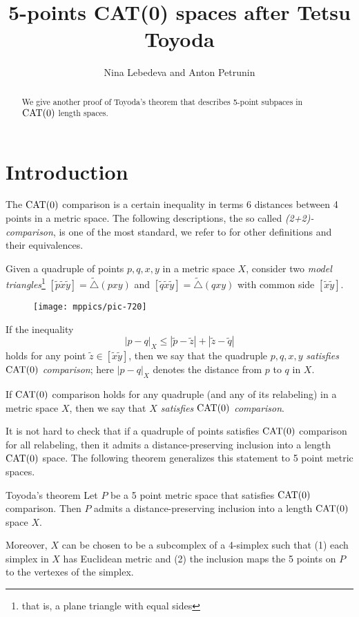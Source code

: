 \documentclass{article}
\begin{document}
\title{5-points CAT(0) spaces after  Tetsu Toyoda}
\author{Nina Lebedeva and Anton Petrunin}
\date{}
\maketitle
\begin{abstract}
We give another proof of Toyoda's theorem that describes 5-point subpaces in $\mathrm{CAT}(0)$ length spaces.
\end{abstract}

\section{Introduction}

The $\mathrm{CAT}(0)$ comparison is a certain inequality in terms 6 distances between 4 points in a metric space.
The following descriptions, the so called \emph{(2+2)-comparison}, is one of the most standard,
we refer to \cite{alexander-kapovitch-petrunin} for other definitions and their equivalences.

Given a quadruple of points $p,q,x,y$ in a metric space $X$,
consider two \emph{model triangles}\footnote{that is, a plane triangle with equal sides}
$[\tilde p\tilde x\tilde y]=\tilde\triangle(pxy)$ 
and 
$[\tilde q\tilde x\tilde y]=\tilde\triangle(qxy)$ with common side $[\tilde x\tilde y]$.

\begin{wrapfigure}{r}{25mm}
\vskip-4mm
\centering
\texttt{[image: mppics/pic-720]}
\end{wrapfigure}

If the inequality
\[|p-q|_X\le |\tilde p-\tilde z|+|\tilde z-\tilde q|\]
holds for any point $\tilde z\in [\tilde x\tilde y]$, then we say that 
the quadruple $p,q,x,y$ \emph{satisfies $\mathrm{CAT}(0)$ comparison};
here $|p-q|_X$ denotes the distance from $p$ to $q$ in $X$.

If $\mathrm{CAT}(0)$ comparison holds for any quadruple (and any of its relabeling) in a metric space $X$,
then we say that \emph{$X$ satisfies $\mathrm{CAT}(0)$ comparison}.


It is not hard to check that if a quadruple of points satisfies $\mathrm{CAT}(0)$ comparison for all relabeling,
then it admits a distance-preserving inclusion into a length $\mathrm{CAT}(0)$ space.
The following theorem generalizes this statement to 5 point metric spaces.

\begin{thm}{Toyoda's theorem}
Let $P$ be a 5 point metric space that satisfies $\mathrm{CAT}(0)$ comparison.
Then $P$ admits a distance-preserving inclusion into a length $\mathrm{CAT}(0)$ space $X$.

Moreover,
$X$ can be chosen to be a subcomplex of a 4-simplex such that (1) each simplex in $X$ has Euclidean metric and (2) the inclusion maps the 5 points on $P$ to the vertexes of the simplex.
\end{thm}
\end{document}
